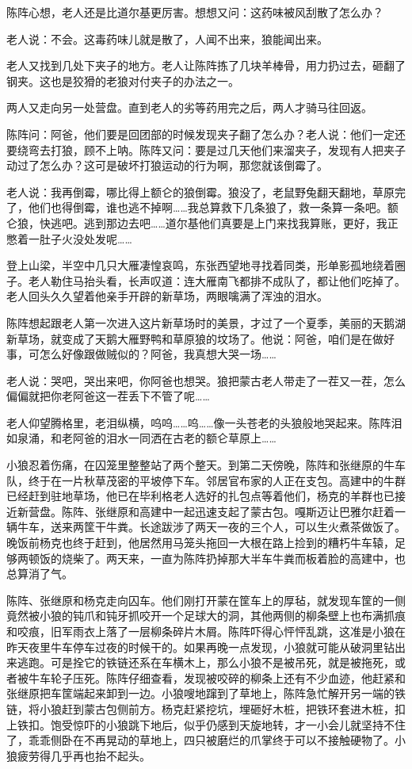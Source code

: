 \par 陈阵心想，老人还是比道尔基更厉害。想想又问：这药味被风刮散了怎么办？
\par 老人说：不会。这毒药味儿就是散了，人闻不出来，狼能闻出来。
\par 老人又找到几处下夹子的地方。老人让陈阵拣了几块羊棒骨，用力扔过去，砸翻了钢夹。这也是狡猾的老狼对付夹子的办法之一。
\par 两人又走向另一处营盘。直到老人的劣等药用完之后，两人才骑马往回返。
\par 陈阵问：阿爸，他们要是回团部的时候发现夹子翻了怎么办？老人说：他们一定还要绕弯去打狼，顾不上呐。陈阵又问：要是过几天他们来溜夹子，发现有人把夹子动过了怎么办？这可是破坏打狼运动的行为啊，那您就该倒霉了。
\par 老人说：我再倒霉，哪比得上额仑的狼倒霉。狼没了，老鼠野兔翻天翻地，草原完了，他们也得倒霉，谁也逃不掉啊……我总算救下几条狼了，救一条算一条吧。额仑狼，快逃吧。逃到那边去吧……道尔基他们真要是上门来找我算账，更好，我正憋着一肚子火没处发呢……
\par 登上山梁，半空中几只大雁凄惶哀鸣，东张西望地寻找着同类，形单影孤地绕着圈子。老人勒住马抬头看，长声叹道：连大雁南飞都排不成队了，都让他们吃掉了。老人回头久久望着他亲手开辟的新草场，两眼噙满了浑浊的泪水。
\par 陈阵想起跟老人第一次进入这片新草场时的美景，才过了一个夏季，美丽的天鹅湖新草场，就变成了天鹅大雁野鸭和草原狼的坟场了。他说：阿爸，咱们是在做好事，可怎么好像跟做贼似的？阿爸，我真想大哭一场……
\par 老人说：哭吧，哭出来吧，你阿爸也想哭。狼把蒙古老人带走了一茬又一茬，怎么偏偏就把你老阿爸这一茬丢下不管了呢……
\par 老人仰望腾格里，老泪纵横，呜呜……呜……像一头苍老的头狼般地哭起来。陈阵泪如泉涌，和老阿爸的泪水一同洒在古老的额仑草原上……
\par 
\par 小狼忍着伤痛，在囚笼里整整站了两个整天。到第二天傍晚，陈阵和张继原的牛车队，终于在一片秋草茂密的平坡停下车。邻居官布家的人正在支包。高建中的牛群已经赶到驻地草场，他已在毕利格老人选好的扎包点等着他们，杨克的羊群也已接近新营盘。陈阵、张继原和高建中一起迅速支起了蒙古包。嘎斯迈让巴雅尔赶着一辆牛车，送来两筐干牛粪。长途跋涉了两天一夜的三个人，可以生火煮茶做饭了。晚饭前杨克也终于赶到，他居然用马笼头拖回一大根在路上捡到的糟朽牛车辕，足够两顿饭的烧柴了。两天来，一直为陈阵扔掉那大半车牛粪而板着脸的高建中，也总算消了气。
\par 陈阵、张继原和杨克走向囚车。他们刚打开蒙在筐车上的厚毡，就发现车筐的一侧竟然被小狼的钝爪和钝牙抓咬开一个足球大的洞，其他两侧的柳条壁上也布满抓痕和咬痕，旧军雨衣上落了一层柳条碎片木屑。陈阵吓得心怦怦乱跳，这准是小狼在昨天夜里牛车停车过夜的时候干的。如果再晚一点发现，小狼就可能从破洞里钻出来逃跑。可是拴它的铁链还系在车横木上，那么小狼不是被吊死，就是被拖死，或者被牛车轮子压死。陈阵仔细查看，发现被咬碎的柳条上还有不少血迹，他赶紧和张继原把车筐端起来卸到一边。小狼嗖地蹿到了草地上，陈阵急忙解开另一端的铁链，将小狼赶到蒙古包侧前方。杨克赶紧挖坑，埋砸好木桩，把铁环套进木桩，扣上铁扣。饱受惊吓的小狼跳下地后，似乎仍感到天旋地转，才一小会儿就坚持不住了，乖乖侧卧在不再晃动的草地上，四只被磨烂的爪掌终于可以不接触硬物了。小狼疲劳得几乎再也抬不起头。
